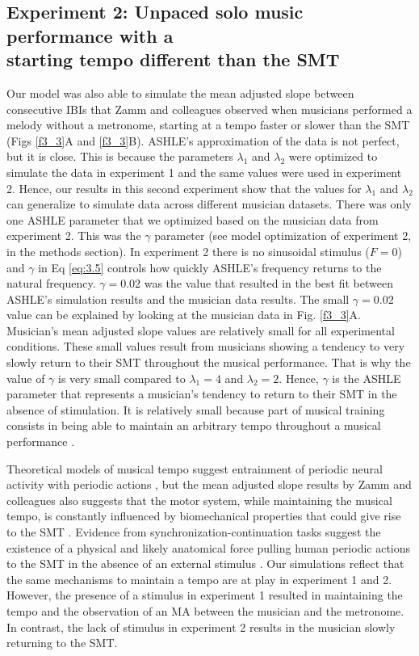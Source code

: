 \documentclass{report}
\begin{document}
\subsection{Experiment 2: Unpaced solo music performance with a \\ starting tempo different than the SMT}

Our model was also able to simulate the mean adjusted slope between consecutive IBIs that Zamm and colleagues \cite{zamm2018musicians} observed when musicians performed a melody without a metronome, starting at a tempo faster or slower than the SMT (Figs \ref{f3_3}A and \ref{f3_3}B). ASHLE's approximation of the data is not perfect, but it is close. This is because the parameters $\lambda_1$ and $\lambda_2$ were optimized to simulate the data in experiment 1 and the same values were used in experiment 2. Hence, our results in this second experiment show that the values for $\lambda_1$ and $\lambda_2$ can generalize to simulate data across different musician datasets. There was only one ASHLE parameter that we optimized based on the musician data from experiment 2. This was the $\gamma$ parameter (see model optimization of experiment 2, in the methods section). In experiment 2 there is no sinusoidal stimulus ($F=0$) and $\gamma$ in Eq \eqref{eq:3.5} controls how quickly ASHLE's frequency returns to the natural frequency. $\gamma = 0.02$ was the value that resulted in the best fit between ASHLE's simulation results and the musician data results. The small $\gamma=0.02$ value can be explained by looking at the musician data in Fig.{} \ref{f3_3}A. Musician's mean adjusted slope values are relatively small for all experimental conditions. These small values result from musicians showing a tendency to very slowly return to their SMT throughout the musical performance. That is why the value of $\gamma$ is very small compared to $\lambda_1=4$ and $\lambda_2=2$. Hence, $\gamma$ is the ASHLE parameter that represents a musician's tendency to return to their SMT in the absence of stimulation. It is relatively small because part of musical training consists in being able to maintain an arbitrary tempo throughout a musical performance \cite{fine2009memory, schultz2019roles}.

Theoretical models of musical tempo suggest entrainment of periodic neural activity with periodic actions \cite{large1999dynamics}, but the mean adjusted slope results by Zamm and colleagues \cite{zamm2018musicians} also suggests that the motor system, while maintaining the musical tempo, is constantly influenced by biomechanical properties that could give rise to the SMT \cite{goodman2000advantages}. Evidence from synchronization-continuation tasks suggest the existence of a physical and likely anatomical force pulling human periodic actions to the SMT in the absence of an external stimulus \cite{yu2003task, mcauley2006time}. Our simulations reflect that the same mechanisms to maintain a tempo are at play in experiment 1 and 2. However, the presence of a stimulus in experiment 1 resulted in maintaining the tempo and the observation of an MA between the musician and the metronome. In contrast, the lack of stimulus in experiment 2 results in the musician slowly returning to the SMT.
\end{document}
